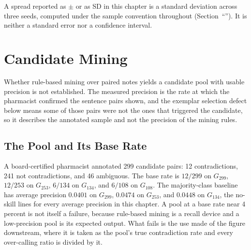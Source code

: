 A spread reported as $\pm$ or as SD in this chapter is a standard deviation across
three seeds, computed under the sample convention throughout
(Section~``''). It is neither a standard error nor a
confidence interval.

\section{Candidate Mining}
\label{sec:res-rq1}

Whether rule-based mining over paired notes yields a candidate pool with usable
precision is not established. The measured precision is the rate at which the
pharmacist confirmed the sentence pairs shown, and the exemplar selection defect
below means some of those pairs were not the ones that triggered the candidate,
so it describes the annotated sample and not the precision of the mining
rules.

\subsection{The Pool and Its Base Rate}

A board-certified pharmacist annotated 299 candidate pairs: 12 contradictions,
241 not contradictions, and 46 ambiguous. The base rate is $12/299$ on $G_{299}$,
$12/253$ on $G_{253}$, $6/134$ on $G_{134}$, and $6/108$ on $G_{108}$. The majority-class baseline has
average precision $0.0401$ on $G_{299}$, $0.0474$ on $G_{253}$, and $0.0448$ on
$G_{134}$, the no-skill lines for every average precision in this chapter. A pool at a base rate near 4 percent is not itself a failure,
because rule-based mining is a recall device and a low-precision pool is its
expected output. What fails is the use made of the figure downstream, where it is taken as the
pool's true contradiction rate and every over-calling ratio is divided by it.


